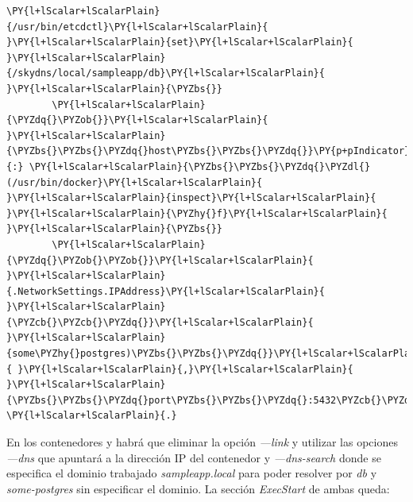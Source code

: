 \begin{codelisting}
\begin{Verbatim}[fontsize=\relsize{-2.5},fontseries=b,commandchars=\\\{\}]
        \PY{l+lScalar+lScalarPlain}{/usr/bin/etcdctl}\PY{l+lScalar+lScalarPlain}{ }\PY{l+lScalar+lScalarPlain}{set}\PY{l+lScalar+lScalarPlain}{ }\PY{l+lScalar+lScalarPlain}{/skydns/local/sampleapp/db}\PY{l+lScalar+lScalarPlain}{ }\PY{l+lScalar+lScalarPlain}{\PYZbs{}}
        \PY{l+lScalar+lScalarPlain}{\PYZdq{}\PYZob{}}\PY{l+lScalar+lScalarPlain}{ }\PY{l+lScalar+lScalarPlain}{\PYZbs{}\PYZbs{}\PYZdq{}host\PYZbs{}\PYZbs{}\PYZdq{}}\PY{p+pIndicator}{:} \PY{l+lScalar+lScalarPlain}{\PYZbs{}\PYZbs{}\PYZdq{}\PYZdl{}(/usr/bin/docker}\PY{l+lScalar+lScalarPlain}{ }\PY{l+lScalar+lScalarPlain}{inspect}\PY{l+lScalar+lScalarPlain}{ }\PY{l+lScalar+lScalarPlain}{\PYZhy{}f}\PY{l+lScalar+lScalarPlain}{ }\PY{l+lScalar+lScalarPlain}{\PYZbs{}}
        \PY{l+lScalar+lScalarPlain}{\PYZdq{}\PYZob{}\PYZob{}}\PY{l+lScalar+lScalarPlain}{ }\PY{l+lScalar+lScalarPlain}{.NetworkSettings.IPAddress}\PY{l+lScalar+lScalarPlain}{ }\PY{l+lScalar+lScalarPlain}{\PYZcb{}\PYZcb{}\PYZdq{}}\PY{l+lScalar+lScalarPlain}{ }\PY{l+lScalar+lScalarPlain}{some\PYZhy{}postgres)\PYZbs{}\PYZbs{}\PYZdq{}}\PY{l+lScalar+lScalarPlain}{ }\PY{l+lScalar+lScalarPlain}{,}\PY{l+lScalar+lScalarPlain}{ }\PY{l+lScalar+lScalarPlain}{\PYZbs{}\PYZbs{}\PYZdq{}port\PYZbs{}\PYZbs{}\PYZdq{}:5432\PYZcb{}\PYZdq{}\PYZsq{}}
\PY{l+lScalar+lScalarPlain}{.}
\end{Verbatim}
\end{codelisting}

En los contenedores  y  habrá que eliminar la opción \textit{---link} y utilizar las opciones \textit{---dns} que apuntará a la dirección IP del contenedor  y \textit{---dns-search} donde se especifica el dominio trabajado \textit{sampleapp.local} para poder resolver por \textit{db} y \textit{some-postgres} sin especificar el dominio. La sección \textit{ExecStart} de ambas queda:

